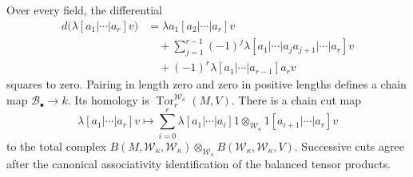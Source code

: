\begin{theorem}\label{mb:thm:mode-bar}
Over every field, the differential
\[
 \begin{aligned}
 d\bigl(\lambda[a_1|\cdots|a_r]v\bigr)
 &=\lambda a_1[a_2|\cdots|a_r]v\\
 &\quad+\sum_{j=1}^{r-1}(-1)^j
   \lambda[a_1|\cdots|a_ja_{j+1}|\cdots|a_r]v\\
 &\quad+(-1)^r\lambda[a_1|\cdots|a_{r-1}]a_rv
 \end{aligned}
\]
squares to zero.  Pairing in length zero and zero in positive lengths
defines a chain map \(\mathcal B_\bullet\to k\).
Its homology is \(\operatorname{Tor}^{\mathscr W_\kappa}_r(M,V)\).
There is a chain cut map
\begin{equation}\label{mb:eq:module-cuts}
 \lambda[a_1|\cdots|a_r]v\longmapsto
 \sum_{i=0}^r
 \lambda[a_1|\cdots|a_i]1
   \otimes_{\mathscr W_\kappa}
 1[a_{i+1}|\cdots|a_r]v
\end{equation}
to the total complex
\(B(M,\mathscr W_\kappa,\mathscr W_\kappa)
 \otimes_{\mathscr W_\kappa}
 B(\mathscr W_\kappa,\mathscr W_\kappa,V)\).
Successive cuts agree after the canonical associativity identification
of the balanced tensor products.
\end{theorem}

